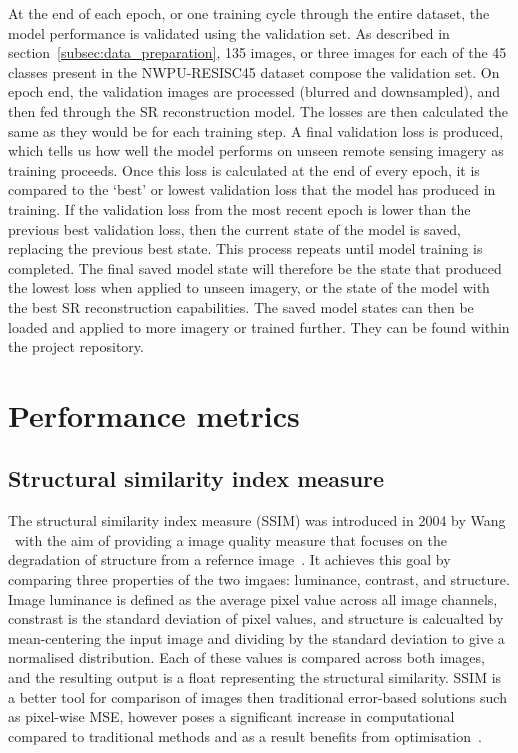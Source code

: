 At the end of each epoch, or one training cycle through the entire dataset, the model performance is validated using the validation set. As described in section~\ref{subsec:data_preparation}, 135 images, or three images for each of the 45 classes present in the NWPU-RESISC45 dataset compose the validation set. On epoch end, the validation images are processed (blurred and downsampled), and then fed through the SR reconstruction model. The losses are then calculated the same as they would be for each training step. A final validation loss is produced, which tells us how well the model performs on unseen remote sensing imagery as training proceeds. Once this loss is calculated at the end of every epoch, it is compared to the `best' or lowest validation loss that the model has produced in training. If the validation loss from the most recent epoch is lower than the previous best validation loss, then the current state of the model is saved, replacing the previous best state. This process repeats until model training is completed. The final saved model state will therefore be the state that produced the lowest loss when applied to unseen imagery, or the state of the model with the best SR reconstruction capabilities. The saved model states can then be loaded and applied to more imagery or trained further. They can be found within the project repository.

\section{Performance metrics}
\subsection{Structural similarity index measure}
The structural similarity index measure (SSIM) was introduced in 2004 by Wang \etal\ with the aim of providing a image quality measure that focuses on the degradation of structure from a refernce image~\cite{ssim}. It achieves this goal by comparing three properties of the two imgaes: luminance, contrast, and structure. Image luminance is defined as the average pixel value across all image channels, constrast is the standard deviation of pixel values, and structure is calcualted by mean-centering the input image and dividing by the standard deviation to give a normalised distribution. Each of these values is compared across both images, and the resulting output is a float representing the structural similarity. SSIM is a better tool for comparison of images then traditional error-based solutions such as pixel-wise MSE, however poses a significant increase in computational compared to traditional methods and as a result benefits from optimisation~\cite{ssim}.

